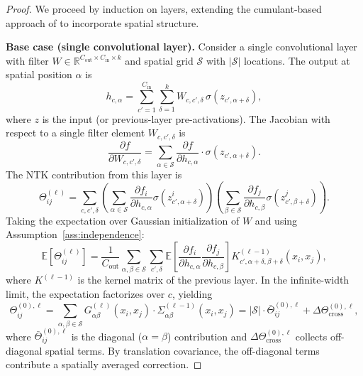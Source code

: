 \documentclass[11pt]{article}
\theoremstyle{definition}
\newcommand{\R}{\mathbb{R}}
\newcommand{\E}{\mathbb{E}}
\newcommand{\cS}{\mathcal{S}}
\newcommand{\pp}{\partial}
\renewcommand{\Theta}{\varTheta}
\begin{document}
\begin{proof}
We proceed by induction on layers, extending the cumulant-based approach of \citet{dyer2020asymptotics} to incorporate spatial structure.

\textbf{Base case (single convolutional layer).} Consider a single convolutional layer with filter $W \in \R^{C_{\mathrm{out}} \times C_{\mathrm{in}} \times k}$ and spatial grid $\cS$ with $|\cS|$ locations. The output at spatial position $\alpha$ is
\begin{equation}
h_{c,\alpha} = \sum_{c'=1}^{C_{\mathrm{in}}} \sum_{\delta=1}^{k} W_{c,c',\delta}\, \sigma(z_{c', \alpha+\delta}),
\end{equation}
where $z$ is the input (or previous-layer pre-activations). The Jacobian with respect to a single filter element $W_{c,c',\delta}$ is
\begin{equation}
\frac{\pp f}{\pp W_{c,c',\delta}} = \sum_{\alpha \in \cS} \frac{\pp f}{\pp h_{c,\alpha}} \cdot \sigma(z_{c',\alpha+\delta}).
\end{equation}
The NTK contribution from this layer is
\begin{equation}
\Theta_{ij}^{(\ell)} = \sum_{c,c',\delta} \left(\sum_{\alpha \in \cS} \frac{\pp f_i}{\pp h_{c,\alpha}} \sigma(z^i_{c',\alpha+\delta})\right)\left(\sum_{\beta \in \cS} \frac{\pp f_j}{\pp h_{c,\beta}} \sigma(z^j_{c',\beta+\delta})\right).
\end{equation}
Taking the expectation over Gaussian initialization of $W$ and using Assumption~\ref{ass:independence}:
\begin{equation}
\E[\Theta_{ij}^{(\ell)}] = \frac{1}{C_{\mathrm{out}}} \sum_{\alpha,\beta \in \cS} \sum_{c',\delta} \E\!\left[\frac{\pp f_i}{\pp h_{c,\alpha}}\frac{\pp f_j}{\pp h_{c,\beta}}\right] K^{(\ell-1)}_{c',\alpha+\delta,\beta+\delta}(x_i, x_j),
\end{equation}
where $K^{(\ell-1)}$ is the kernel matrix of the previous layer. In the infinite-width limit, the expectation factorizes over $c$, yielding
\begin{equation}
\Theta^{(0),\ell}_{ij} = \sum_{\alpha,\beta \in \cS} G_{\alpha\beta}^{(\ell)}(x_i, x_j) \cdot \Sigma_{\alpha\beta}^{(\ell-1)}(x_i, x_j) = |\cS| \cdot \bar{\Theta}^{(0),\ell}_{ij} + \Delta\Theta^{(0),\ell}_{\mathrm{cross}},
\end{equation}
where $\bar{\Theta}^{(0),\ell}_{ij}$ is the diagonal ($\alpha = \beta$) contribution and $\Delta\Theta^{(0),\ell}_{\mathrm{cross}}$ collects off-diagonal spatial terms. By translation covariance, the off-diagonal terms contribute a spatially averaged correction.


\end{proof}
\end{document}
